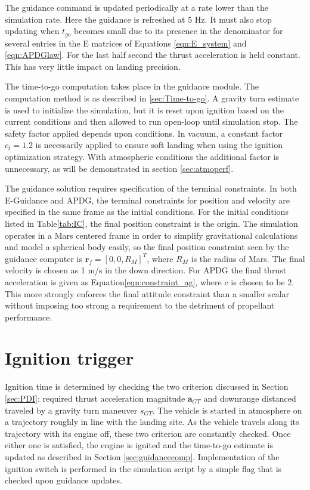 The guidance command is updated periodically at a rate lower than the simulation rate. Here the guidance is refreshed at 5 Hz. It must also stop updating when $t_{go}$ becomes small due to its presence in the denominator for several entries in the E matrices of Equations \ref{eqn:E_system} and \ref{eqn:APDGlaw}. For the last half second the thrust acceleration is held constant. This has very little impact on landing precision.

The time-to-go computation takes place in the guidance module. The computation method is as described in \ref{sec:Time-to-go}. A gravity turn estimate is used to initialize the simulation, but it is reset upon ignition based on the current conditions and then allowed to run open-loop until simulation stop. The safety factor applied depends upon conditions. In vacuum, a constant factor $c_t = 1.2$ is necessarily applied to ensure soft landing when using the ignition optimization strategy. With atmospheric conditions the additional factor is unnecessary, as will be demonstrated in section \ref{sec:atmoperf}.

The guidance solution requires specification of the terminal constraints. In both E-Guidance and APDG, the terminal constraints for position and velocity are specified in the same frame as the initial conditions. For the initial conditions listed in Table\:\ref{tab:IC}, the final position constraint is the origin. The simulation operates in a Mars centered frame in order to simplify gravitational calculations and model a spherical body easily, so the final position constraint seen by the guidance computer is $\bm{r}_f = [0,0,R_M]^T$, where $R_M$ is the radius of Mars. The final velocity is chosen as 1 m/s in the down direction. For APDG the final thrust acceleration is given as Equation\:\ref{eqn:constraint_ag}, where c is chosen to be 2. This more strongly enforces the final attitude constraint than a smaller scalar without imposing too strong a requirement to the detriment of propellant performance.

\section{Ignition trigger}
Ignition time is determined by checking the two criterion discussed in Section \ref{sec:PDI}: required thrust acceleration magnitude $\bm{a}_{GT}$ and downrange distanced traveled by a gravity turn maneuver $s_{GT}$. The vehicle is started in atmosphere on a trajectory roughly in line with the landing site. As the vehicle travels along its trajectory with its engine off, these two criterion are constantly checked. Once either one is satisfied, the engine is ignited and the time-to-go estimate is updated as described in Section \ref{sec:guidancecomp}. Implementation of the ignition switch is performed in the simulation script by a simple flag that is checked upon guidance updates.

